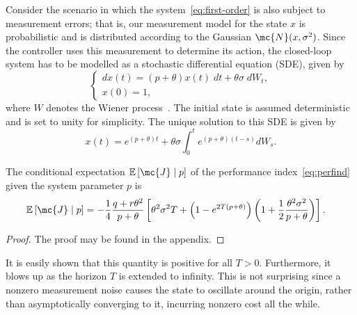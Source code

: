 Consider the scenario in which the system~\eqref{eq:first-order} is also subject
to measurement errors; that is, our measurement model for the state $x$ is
probabilistic and is distributed according to the Gaussian $\mc{N}(x,
\sigma^2)$. Since the controller uses this measurement to determine its action,
the closed-loop system has to be modelled as a stochastic differential equation
(SDE), given by
%
\begin{equation} \begin{cases} dx(t) =
(p+\theta)x(t) \; dt + \theta\sigma \; dW_t, \\ x(0) = 1,
\end{cases} \label{eq:first-order-SDE} \end{equation}
%
where $W$ denotes the Wiener process~\cite{evans2012introduction}. The initial
state is assumed deterministic and is set to unity for simplicity.  
% 
The unique solution to this SDE is given by
%
\begin{equation}
    x(t) = e^{(p+\theta)t} + \theta\sigma \int_0^t e^{(p+\theta)(t-s)}dW_s.
    \label{eq:sol-sde}
\end{equation}
%
\vspace{-4mm}
\begin{lem}\label{lem:1}
    The conditional expectation $\mathbb{E}\left[\mc{J}\mid p\right]$ of the
    performance index~\eqref{eq:perfind} given the system parameter $p$ is 
    \begin{align*} 
      \mathbb{E}\left[\mc{J} \mid p\right] &=-\frac{1}{4}\frac{q+r\theta^2}{p+\theta}
       \left[ \theta^2 \sigma^2 T + \left(1 - e^{2T(p+\theta)}\right) \left(1 +
      \frac{1}{2}\frac{\theta^2\sigma^2}{p+\theta}\right)\right].  
    \end{align*} 
\end{lem}
%

\begin{proof}
    The proof may be found in the appendix.
\end{proof}
%

%
It is easily shown that this quantity is positive for all $T>0$. Furthermore, it
blows up as the horizon $T$ is extended to infinity. This is not surprising
since a nonzero measurement noise causes the state to oscillate around the
origin, rather than asymptotically converging to it, incurring nonzero cost
all the while.



